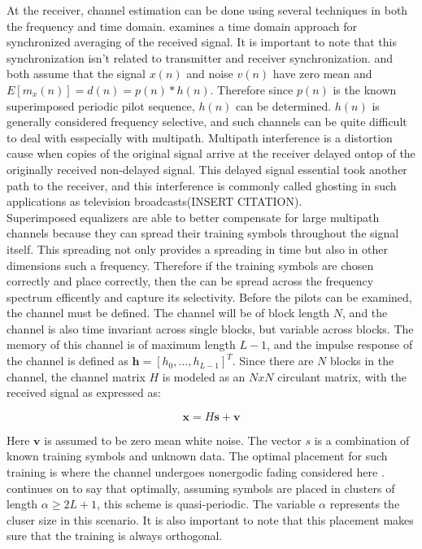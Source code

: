 \documentclass[11pt]{mvlthesis}
\begin{document}
At the receiver, channel estimation can be done using several techniques in both the frequency and time domain.  \cite{17} examines a time domain approach for synchronized averaging of the received signal.  It is important to note that this synchronization isn't related to transmitter and receiver synchronization.  \cite{17} and \cite{18} both assume that the signal \( x(n)\) and noise \( v(n) \) have zero mean and \(E[m_{x}(n)] = d(n) = p(n) \ast h(n)\).  Therefore since \(p(n) \) is the known superimposed periodic pilot sequence, \(h(n)\) can be determined.  \(h(n)\) is generally considered frequency selective, and such channels can be quite difficult to deal with esspecially with multipath.  Multipath interference is a distortion cause when copies of the original signal arrive at the receiver delayed ontop of the originally received non-delayed signal.  This delayed signal essential took another path to the receiver, and this interference is commonly called ghosting in such applications as television broadcasts(INSERT CITATION).\\

Superimposed equalizers are able to better compensate for large multipath channels because they can spread their training symbols throughout the signal itself.  This spreading not only provides a spreading in time but also in other dimensions such a frequency.  Therefore if the training symbols are chosen correctly and place correctly, then the can be spread across the frequency spectrum efficently and capture its selectivity.  Before the pilots can be examined, the channel must be defined.  The channel will be of block length \(N\), and the channel is also time invariant across single blocks, but variable across blocks.  The memory of this channel is of maximum length \(L-1\), and the impulse response of the channel is defined as \(\textbf{h}=[h_{0},...,h_{L-1}]^{T}\).  Since there are \(N\) blocks in the channel, the channel matrix \(H\) is modeled as an \(N x N\) circulant matrix, with the received signal as expressed as:

\[ \textbf{x}=\textit{H}\textbf{s}+\textbf{v}  \]

Here \(\textbf{v}\) is assumed to be zero mean white noise.  The vector \(s\) is a combination of known training symbols and unknown data.  The optimal placement for such training is where the channel undergoes nonergodic fading considered here \cite{20}.  \cite{16} continues on to say that optimally, assuming symbols are placed in clusters of length \(\alpha \ge 2L+1\), this scheme is quasi-periodic.  The variable \(\alpha\) represents the cluser size in this scenario.  It is also important to note that this placement makes sure that the training is always orthogonal.\\
\end{document}
